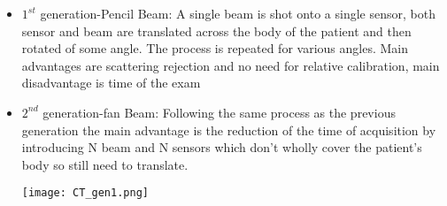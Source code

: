 \begin{itemize}
\item $1^{st}$ generation-Pencil Beam: A single beam is shot onto a single sensor, both sensor and beam are translated across the body of the patient and then rotated of some angle. The process is repeated for various angles. Main advantages are scattering rejection and no need for relative calibration, main disadvantage is time of the exam
\item $2^{nd}$ generation-fan Beam: Following the same process as the previous generation the main advantage is the reduction of the time of acquisition by introducing N beam and N sensors which don't wholly cover the patient's body so still need to translate.

\begin{minipage}{\linewidth}
            \centering
            \texttt{[image: CT\_gen1.png]}
        \end{minipage}
        

\end{itemize}
